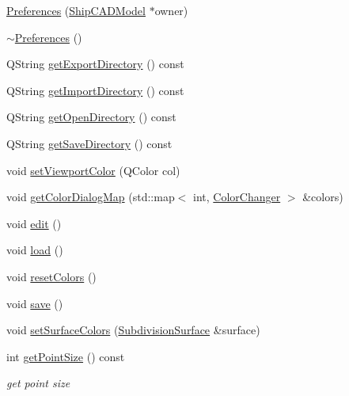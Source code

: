 \begin{DoxyCompactItemize}
\item 
\hyperlink{classShipCAD_1_1Preferences_afd469134e34b7e1982efeb1e402fce3b}{Preferences} (\hyperlink{classShipCAD_1_1ShipCADModel}{Ship\+C\+A\+D\+Model} $\ast$owner)
\item 
\hyperlink{classShipCAD_1_1Preferences_ab38e15f8965b1cd69b80369bb16a0995}{$\sim$\+Preferences} ()
\item 
Q\+String \hyperlink{classShipCAD_1_1Preferences_a9673a7bf93112ff78b6c8ca5d7cc3a4b}{get\+Export\+Directory} () const 
\item 
Q\+String \hyperlink{classShipCAD_1_1Preferences_a275aac8dc6e72c021ad00ff68f2fba54}{get\+Import\+Directory} () const 
\item 
Q\+String \hyperlink{classShipCAD_1_1Preferences_ab1ac99acb5ceb37b5cf7f6b21f376f27}{get\+Open\+Directory} () const 
\item 
Q\+String \hyperlink{classShipCAD_1_1Preferences_a5ee1cbf3c572b9253cfe958055e0eb43}{get\+Save\+Directory} () const 
\item 
void \hyperlink{classShipCAD_1_1Preferences_ad120b46e68a08d7682aaeb351b4c179d}{set\+Viewport\+Color} (Q\+Color col)
\item 
void \hyperlink{classShipCAD_1_1Preferences_a02f80a902cb9d1887820fbd2cc116407}{get\+Color\+Dialog\+Map} (std\+::map$<$ int, \hyperlink{structShipCAD_1_1ColorChanger}{Color\+Changer} $>$ \&colors)
\item 
void \hyperlink{classShipCAD_1_1Preferences_a326180a1551596a3a9f2709d31c9fb10}{edit} ()
\item 
void \hyperlink{classShipCAD_1_1Preferences_a70c1b8f3b9e117d67c3cd50c33f66f3a}{load} ()
\item 
void \hyperlink{classShipCAD_1_1Preferences_a2e7e496b3417148240994e51281b0858}{reset\+Colors} ()
\item 
void \hyperlink{classShipCAD_1_1Preferences_ab3f40207c39fe262a7ae16ca22b297b2}{save} ()
\item 
void \hyperlink{classShipCAD_1_1Preferences_a9c1e6e137131d41b962ae1cb4a943bd0}{set\+Surface\+Colors} (\hyperlink{classShipCAD_1_1SubdivisionSurface}{Subdivision\+Surface} \&surface)
\item 
int \hyperlink{classShipCAD_1_1Preferences_af474c1924b33adccb7299a95a768d610}{get\+Point\+Size} () const 
\begin{DoxyCompactList}\small\item\em get point size \end{DoxyCompactList}\item 

\end{DoxyCompactItemize}
